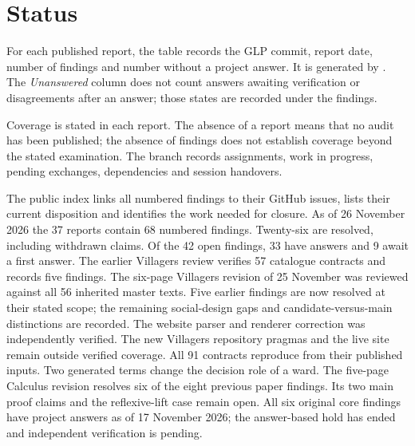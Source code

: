 \section{Status}

For each published report, the table records the GLP commit, report date, number of findings and number without a project answer. It is generated by . The \emph{Unanswered} column does not count answers awaiting verification or disagreements after an answer; those states are recorded under the findings.

Coverage is stated in each report. The absence of a report means that no audit has been published; the absence of findings does not establish coverage beyond the stated examination. The  branch records assignments, work in progress, pending exchanges, dependencies and session handovers.

The public  index links all numbered findings to their GitHub issues, lists their current disposition and identifies the work needed for closure. As of 26 November 2026 the 37 reports contain 68 numbered findings. Twenty-six are resolved, including withdrawn claims. Of the 42 open findings, 33 have answers and 9 await a first answer. The earlier Villagers review verifies 57 catalogue contracts and records five findings. The six-page Villagers revision of 25 November was reviewed against all 56 inherited master texts. Five earlier findings are now resolved at their stated scope; the remaining social-design gaps and candidate-versus-main distinctions are recorded. The website parser and renderer correction was independently verified. The new Villagers repository pragmas and the live site remain outside verified coverage. All 91 contracts reproduce from their published inputs. Two generated terms change the decision role of a ward. The five-page Calculus revision resolves six of the eight previous paper findings. Its two main proof claims and the reflexive-lift case remain open. All six original core findings have project answers as of 17 November 2026; the answer-based hold has ended and independent verification is pending.



